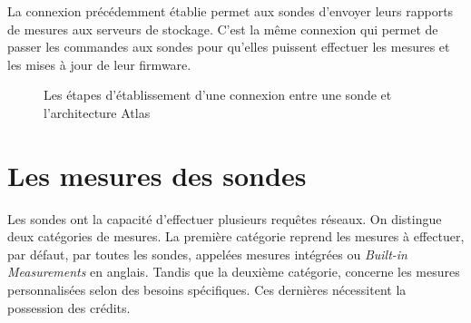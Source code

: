 La connexion précédemment établie permet aux sondes  d'envoyer leurs  rapports de mesures  aux serveurs de stockage. C'est la même connexion qui permet de passer les commandes aux sondes pour qu'elles puissent effectuer les mesures et les mises à jour de leur firmware.

\begin{figure}[h]
	\captionsetup{justification=centering}
	\centering
	\resizebox{\textwidth}{!}{
		 
	}
	\caption{Les étapes d'établissement d'une connexion entre une sonde  et l'architecture Atlas}
	\label{fig:deroulement-connexion-ripe-atlas}
\end{figure}



\section{Les mesures des sondes}
Les sondes ont la capacité d'effectuer plusieurs requêtes  réseaux. On distingue deux catégories de mesures. La première catégorie reprend les mesures à effectuer, par défaut, par toutes les sondes, appelées  mesures intégrées ou \textit{Built-in Measurements} en anglais. Tandis que la deuxième catégorie, concerne les mesures personnalisées selon des besoins spécifiques. Ces dernières nécessitent la possession des crédits.
